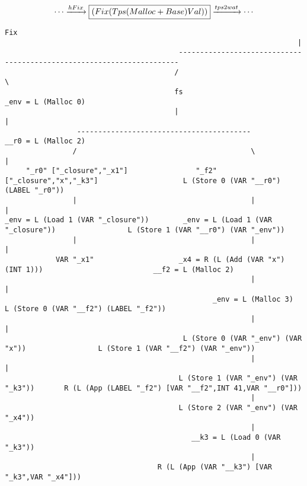\begin{landscape}
\begin{lstlisting}[basicstyle=\fontsize{9}{10}\selectfont\ttfamily]
\end{lstlisting}
\end{landscape}
\clearpage

\begin{landscape}
\begin{gather*}
  \cdots \xrightarrow{hFix} \boxed{(Fix (Tps (Malloc + Base) Val))} \xrightarrow{tps2wat} \cdots
\end{gather*}
\begin{lstlisting}[basicstyle=\fontsize{9}{10}\selectfont\ttfamily]
                                                                    Fix
                                                                     |
                                         ----------------------------------------------------------------------
                                        /                                                                      \
                                        fs                                                            _env = L (Malloc 0)
                                        |                                                                      |
                 -----------------------------------------                                            __r0 = L (Malloc 2)
                /                                         \                                                    |
     "_r0" ["_closure","_x1"]                "_f2" ["_closure","x","_k3"]                    L (Store 0 (VAR "__r0") (LABEL "_r0"))
                |                                         |                                                    |
_env = L (Load 1 (VAR "_closure"))        _env = L (Load 1 (VAR "_closure"))                 L (Store 1 (VAR "__r0") (VAR "_env"))
                |                                         |                                                    |
            VAR "_x1"                    _x4 = R (L (Add (VAR "x") (INT 1)))                          __f2 = L (Malloc 2)
                                                          |                                                    |
                                                 _env = L (Malloc 3)                         L (Store 0 (VAR "__f2") (LABEL "_f2"))
                                                          |                                                    |
                                          L (Store 0 (VAR "_env") (VAR "x"))                 L (Store 1 (VAR "__f2") (VAR "_env"))
                                                          |                                                    |
                                         L (Store 1 (VAR "_env") (VAR "_k3"))       R (L (App (LABEL "_f2") [VAR "__f2",INT 41,VAR "__r0"]))
                                                          |
                                         L (Store 2 (VAR "_env") (VAR "_x4"))
                                                          |
                                            __k3 = L (Load 0 (VAR "_k3"))
                                                          |
                                    R (L (App (VAR "__k3") [VAR "_k3",VAR "_x4"]))

\end{lstlisting}
\end{landscape}
